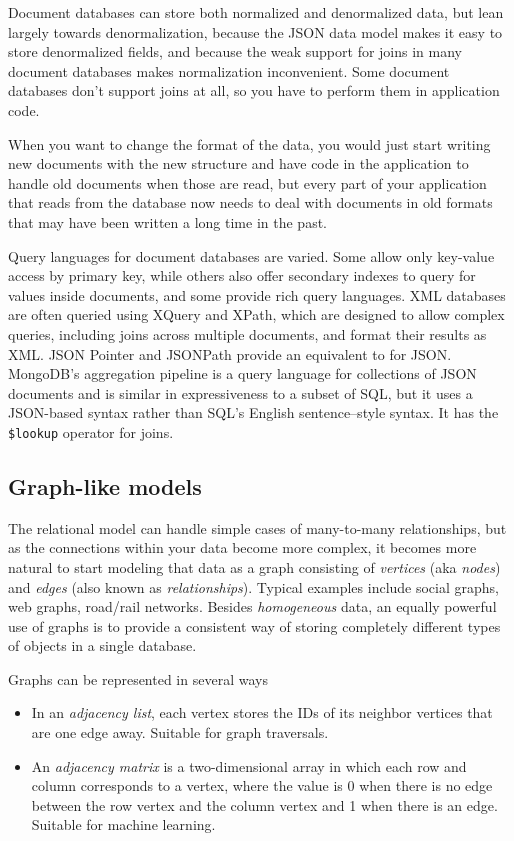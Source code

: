 \documentclass[table, xcdraw]{article}%
\begin{document}
Document databases can store both normalized and denormalized data, but lean largely towards denormalization, because the JSON data model makes it easy to store denormalized fields, and because the weak support for joins in many document databases makes normalization inconvenient. Some document databases don’t support joins at all, so you have to perform them in application code.

When you want to change the format of the data, you would just start writing new documents with the new structure and have code in the application to handle old documents when those are read, but every part of your application that reads from the database now needs to deal with documents in old formats that may have been written a long time in the past.

Query languages for document databases are varied. Some allow only key-value access by primary key, while others also offer secondary indexes to query for values inside documents, and some provide rich query languages. XML databases are often queried using XQuery and XPath, which are designed to allow complex queries, including joins across multiple documents, and format their results as XML. JSON Pointer and JSONPath provide an equivalent to for JSON. MongoDB’s aggregation pipeline is a query language for collections of JSON documents and is similar in expressiveness to a subset of SQL, but it uses a JSON-based syntax rather than SQL’s English sentence–style syntax. It has the \texttt{\$lookup} operator for joins.

\subsection{Graph-like models}

The relational model can handle simple cases of many-to-many relationships, but as the connections within your data become more complex, it becomes more natural to start modeling that data as a graph consisting of \textit{vertices} (aka \textit{nodes}) and \textit{edges} (also known as \textit{relationships}). Typical examples include social graphs, web graphs, road/rail networks. Besides \textit{homogeneous} data, an equally powerful use of graphs is to provide a consistent way of storing completely different types of objects in a single database.

Graphs can be represented in several ways

\begin{itemize}
    \item In an \textit{adjacency list}, each vertex stores the IDs of its neighbor vertices that are one edge away. Suitable for graph traversals.
    \item An \textit{adjacency matrix} is a two-dimensional array in which each row and column corresponds to a vertex, where the value is 0 when there is no edge between the row vertex and the column vertex and 1 when there is an edge. Suitable for machine learning.
\end{itemize}
\end{document}
